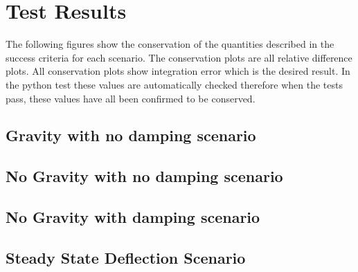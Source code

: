 \section{Test Results}

The following figures show the conservation of the quantities described in the success criteria for each scenario. The conservation plots are all relative difference plots. All conservation plots show integration error which is the desired result. In the python test these values are automatically checked therefore when the tests pass, these values have all been confirmed to be conserved. 

\subsection{Gravity with no damping scenario}




\clearpage

\subsection{No Gravity with no damping scenario}






\clearpage

\subsection{No Gravity with damping scenario}





\clearpage

\subsection{Steady State Deflection Scenario}


\clearpage

